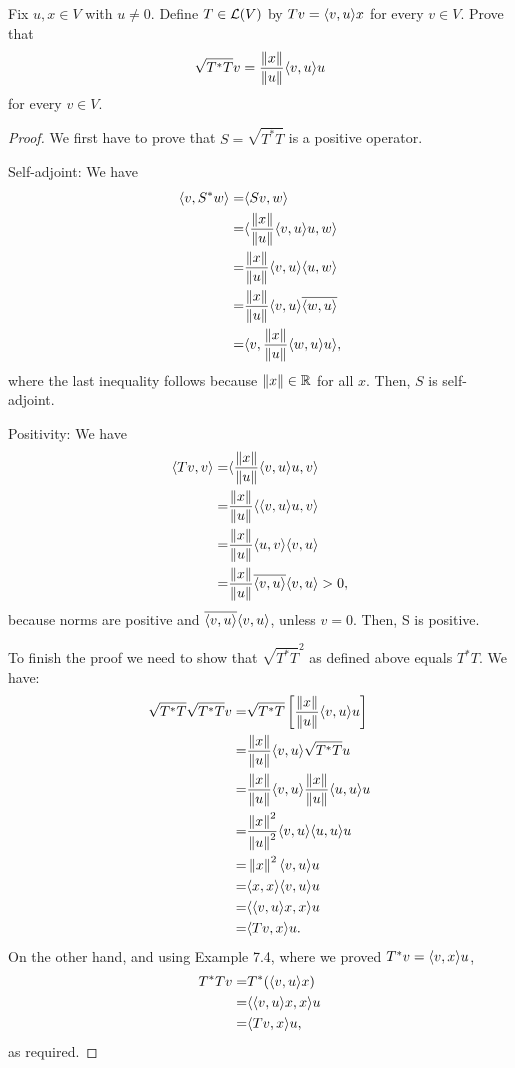 \begin{exercise}{1}
  Fix $u,x\in V$ with $u\neq 0$. Define $T\in\mathcal{L}(V)$ by $Tv =\langle v,u\rangle x$ for every $v\in V$. Prove that
  \[
  \sqrt{T^\ast T}v=\frac{\left\lVert x\right\rVert}{\left\lVert u\right\rVert}\langle v,u\rangle u
  \]
  for every $v\in V$.
\end{exercise}
\begin{proof}
 We first have to prove that $S=\sqrt{T^\ast T}$ is a positive operator.
 
 Self-adjoint: We have 
 \begin{align*}
     \langle v, S^\ast w\rangle =& \langle Sv, w\rangle\\
     =& \langle \frac{\left\lVert x\right\rVert}{\left\lVert u\right\rVert}\langle v,u\rangle u, w\rangle\\
     =& \frac{\left\lVert x\right\rVert}{\left\lVert u\right\rVert}\langle v,u\rangle\langle u, w\rangle\\
     =& \frac{\left\lVert x\right\rVert}{\left\lVert u\right\rVert}\langle v,u\rangle\overline{\langle w, u\rangle}\\
     =& \langle v,\frac{\left\lVert x\right\rVert}{\left\lVert u\right\rVert}\langle w, u\rangle u\rangle,
 \end{align*}
 where the last inequality follows because $\left\lVert x\right\rVert\in\mathbb{R}$ for all $x$. Then, $S$ is self-adjoint.

 Positivity: We have
 \begin{align*}
     \langle Tv,v\rangle =& \langle \frac{\left\lVert x\right\rVert}{\left\lVert u\right\rVert}\langle v,u\rangle u,v\rangle\\
     =& \frac{\left\lVert x\right\rVert}{\left\lVert u\right\rVert}\langle \langle v,u\rangle u,v\rangle\\
     =& \frac{\left\lVert x\right\rVert}{\left\lVert u\right\rVert}\langle u,v\rangle\langle v,u\rangle\\
     =& \frac{\left\lVert x\right\rVert}{\left\lVert u\right\rVert}\overline{\langle v,u\rangle}\langle v,u\rangle>0,
 \end{align*}
 because norms are positive and $\overline{\langle v,u\rangle}\langle v,u\rangle$, unless $v=0$. Then, S is positive.
 
 To finish the proof we need to show that $\sqrt{T^\ast T}^2$ as defined above equals $T^\ast T$. We have:
 \begin{align*}
     \sqrt{T^\ast T}\sqrt{T^\ast T}v =& \sqrt{T^\ast T}\left[\frac{\left\lVert x\right\rVert}{\left\lVert u\right\rVert}\langle v,u\rangle u\right]\\
     =& \frac{\left\lVert x\right\rVert}{\left\lVert u\right\rVert}\langle v,u\rangle\sqrt{T^\ast T}u\\
     =& \frac{\left\lVert x\right\rVert}{\left\lVert u\right\rVert}\langle v,u\rangle\frac{\left\lVert x\right\rVert}{\left\lVert u\right\rVert}\langle u,u\rangle u\\
     =& \frac{\left\lVert x\right\rVert^2}{\left\lVert u\right\rVert^2}\langle v,u\rangle\langle u,u\rangle u\\
     =& \left\lVert x\right\rVert^2\langle v,u\rangle u\\
     =& \langle x,x\rangle\langle v,u\rangle u\\
     =& \langle \langle v,u\rangle x,x\rangle u\\
     =& \langle Tv,x\rangle u.
 \end{align*}
 On the other hand, and using Example 7.4, where we proved $T^\ast v=\langle v,x\rangle u$,
 \begin{align*}
     T^\ast Tv =& T^\ast(\langle v,u\rangle x)\\
     =& \langle \langle v,u\rangle x,x\rangle u\\
     =& \langle Tv,x\rangle u,
 \end{align*}
 as required.
\end{proof}

